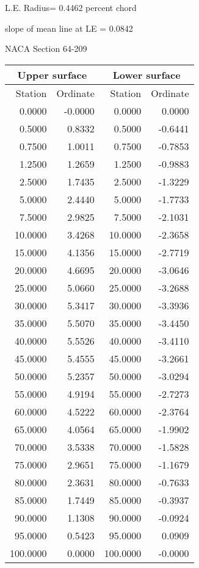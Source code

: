 \documentclass[11pt]{book}
\begin{document}
L.E. Radius=  0.4462 percent chord


 slope of mean line at LE =  0.0842
 \newpage
  \label{s64-209}
 \begin{Large}
 NACA Section 64-209
 \end{Large}
  
 \vspace{8mm}
 \begin{tabular}{|r|r|r|r|} \hline 
 \multicolumn{2}{|c|}{Upper surface} & \multicolumn{2}{|c|}{Lower surface} \\
 \hline
 Station & Ordinate & Station & Ordinate \\
 \hline
0.0000 & -0.0000 & 0.0000 & 0.0000 \\
0.5000 & 0.8332 & 0.5000 & -0.6441 \\
0.7500 & 1.0011 & 0.7500 & -0.7853 \\
1.2500 & 1.2659 & 1.2500 & -0.9883 \\
2.5000 & 1.7435 & 2.5000 & -1.3229 \\
5.0000 & 2.4440 & 5.0000 & -1.7733 \\
7.5000 & 2.9825 & 7.5000 & -2.1031 \\
10.0000 & 3.4268 & 10.0000 & -2.3658 \\
15.0000 & 4.1356 & 15.0000 & -2.7719 \\
20.0000 & 4.6695 & 20.0000 & -3.0646 \\
25.0000 & 5.0660 & 25.0000 & -3.2688 \\
30.0000 & 5.3417 & 30.0000 & -3.3936 \\
35.0000 & 5.5070 & 35.0000 & -3.4450 \\
40.0000 & 5.5526 & 40.0000 & -3.4110 \\
45.0000 & 5.4555 & 45.0000 & -3.2661 \\
50.0000 & 5.2357 & 50.0000 & -3.0294 \\
55.0000 & 4.9194 & 55.0000 & -2.7273 \\
60.0000 & 4.5222 & 60.0000 & -2.3764 \\
65.0000 & 4.0564 & 65.0000 & -1.9902 \\
70.0000 & 3.5338 & 70.0000 & -1.5828 \\
75.0000 & 2.9651 & 75.0000 & -1.1679 \\
80.0000 & 2.3631 & 80.0000 & -0.7633 \\
85.0000 & 1.7449 & 85.0000 & -0.3937 \\
90.0000 & 1.1308 & 90.0000 & -0.0924 \\
95.0000 & 0.5423 & 95.0000 & 0.0909 \\
100.0000 & 0.0000 & 100.0000 & -0.0000 \\
 \hline 
 \end{tabular}
\end{document}
